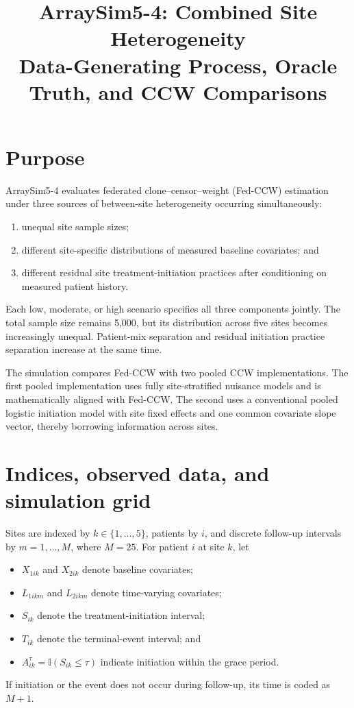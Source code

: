 \documentclass[11pt]{article}
\title{ArraySim5-4: Combined Site Heterogeneity\\
Data-Generating Process, Oracle Truth, and CCW Comparisons}
\author{}
\date{}
\newcommand{\ind}{\mathbb{I}}
\begin{document}
\maketitle

\section{Purpose}

ArraySim5-4 evaluates federated clone--censor--weight (Fed-CCW) estimation
under three sources of between-site heterogeneity occurring simultaneously:
\begin{enumerate}[leftmargin=2em]
  \item unequal site sample sizes;
  \item different site-specific distributions of measured baseline
        covariates; and
  \item different residual site treatment-initiation practices after
        conditioning on measured patient history.
\end{enumerate}
Each low, moderate, or high scenario specifies all three components jointly.
The total sample size remains 5,000, but its distribution across five sites
becomes increasingly unequal. Patient-mix separation and residual initiation
practice separation increase at the same time.

The simulation compares Fed-CCW with two pooled CCW implementations. The first
pooled implementation uses fully site-stratified nuisance models and is
mathematically aligned with Fed-CCW. The second uses a conventional pooled
logistic initiation model with site fixed effects and one common covariate
slope vector, thereby borrowing information across sites.

\section{Indices, observed data, and simulation grid}

Sites are indexed by $k\in\{1,\ldots,5\}$, patients by $i$, and discrete
follow-up intervals by $m=1,\ldots,M$, where $M=25$. For patient $i$ at site
$k$, let
\begin{itemize}[leftmargin=2em]
  \item $X_{1ik}$ and $X_{2ik}$ denote baseline covariates;
  \item $L_{1ikm}$ and $L_{2ikm}$ denote time-varying covariates;
  \item $S_{ik}$ denote the treatment-initiation interval;
  \item $T_{ik}$ denote the terminal-event interval; and
  \item $A_{ik}^{\tau}=\ind(S_{ik}\leq\tau)$ indicate initiation within the
        grace period.
\end{itemize}
If initiation or the event does not occur during follow-up, its time is coded
as $M+1$.
\end{document}

